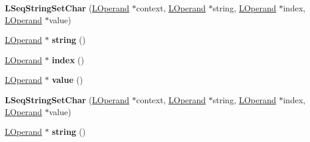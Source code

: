 \begin{DoxyCompactItemize}
\item 
{\bfseries L\+Seq\+String\+Set\+Char} (\hyperlink{classv8_1_1internal_1_1_l_operand}{L\+Operand} $\ast$context, \hyperlink{classv8_1_1internal_1_1_l_operand}{L\+Operand} $\ast$string, \hyperlink{classv8_1_1internal_1_1_l_operand}{L\+Operand} $\ast$index, \hyperlink{classv8_1_1internal_1_1_l_operand}{L\+Operand} $\ast$value)\hypertarget{classv8_1_1internal_1_1_l_seq_string_set_char_a719cac196a8e6c740c4055635b87f496}{}\label{classv8_1_1internal_1_1_l_seq_string_set_char_a719cac196a8e6c740c4055635b87f496}

\item 
\hyperlink{classv8_1_1internal_1_1_l_operand}{L\+Operand} $\ast$ {\bfseries string} ()\hypertarget{classv8_1_1internal_1_1_l_seq_string_set_char_a1fcee06e873470500f85a41f75bd0faa}{}\label{classv8_1_1internal_1_1_l_seq_string_set_char_a1fcee06e873470500f85a41f75bd0faa}

\item 
\hyperlink{classv8_1_1internal_1_1_l_operand}{L\+Operand} $\ast$ {\bfseries index} ()\hypertarget{classv8_1_1internal_1_1_l_seq_string_set_char_ab3e762192555a55b62a9b438635a1178}{}\label{classv8_1_1internal_1_1_l_seq_string_set_char_ab3e762192555a55b62a9b438635a1178}

\item 
\hyperlink{classv8_1_1internal_1_1_l_operand}{L\+Operand} $\ast$ {\bfseries value} ()\hypertarget{classv8_1_1internal_1_1_l_seq_string_set_char_aeb1a6ce9adf8943da9ec22afe2b5af72}{}\label{classv8_1_1internal_1_1_l_seq_string_set_char_aeb1a6ce9adf8943da9ec22afe2b5af72}

\item 
{\bfseries L\+Seq\+String\+Set\+Char} (\hyperlink{classv8_1_1internal_1_1_l_operand}{L\+Operand} $\ast$context, \hyperlink{classv8_1_1internal_1_1_l_operand}{L\+Operand} $\ast$string, \hyperlink{classv8_1_1internal_1_1_l_operand}{L\+Operand} $\ast$index, \hyperlink{classv8_1_1internal_1_1_l_operand}{L\+Operand} $\ast$value)\hypertarget{classv8_1_1internal_1_1_l_seq_string_set_char_a719cac196a8e6c740c4055635b87f496}{}\label{classv8_1_1internal_1_1_l_seq_string_set_char_a719cac196a8e6c740c4055635b87f496}

\item 
\hyperlink{classv8_1_1internal_1_1_l_operand}{L\+Operand} $\ast$ {\bfseries string} ()\hypertarget{classv8_1_1internal_1_1_l_seq_string_set_char_a1fcee06e873470500f85a41f75bd0faa}{}\label{classv8_1_1internal_1_1_l_seq_string_set_char_a1fcee06e873470500f85a41f75bd0faa}


\end{DoxyCompactItemize}
